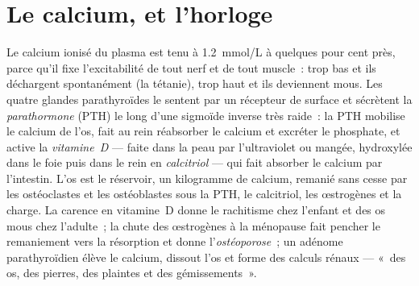 \section{Le calcium, et l'horloge}

\begin{definition}\label{def:b3:endocrinology:calcium}
Le calcium ionisé du plasma est tenu à \qty{1.2}{mmol/L} à quelques pour
cent près, parce qu'il fixe l'excitabilité de tout nerf et de tout
muscle~: trop bas et ils déchargent spontanément (la tétanie), trop haut
et ils deviennent mous. Les quatre glandes parathyroïdes le sentent par
un récepteur de surface et sécrètent la \emph{parathormone} (PTH) le
long d'une sigmoïde inverse très raide~: la PTH mobilise le calcium de
l'os, fait au rein réabsorber le calcium et excréter le phosphate, et
active la \emph{vitamine~D} --- faite dans la peau par l'ultraviolet ou
mangée, hydroxylée dans le foie puis dans le rein en \emph{calcitriol}
--- qui fait absorber le calcium par l'intestin. L'os est le réservoir,
un kilogramme de calcium, remanié sans cesse par les ostéoclastes et les
ostéoblastes sous la PTH, le calcitriol, les œstrogènes et la charge.
La carence en vitamine~D donne le rachitisme chez l'enfant et des os
mous chez l'adulte~; la chute des œstrogènes à la ménopause fait pencher
le remaniement vers la résorption et donne l'\emph{ostéoporose}~; un
adénome parathyroïdien élève le calcium, dissout l'os et forme des
calculs rénaux --- «~des os, des pierres, des plaintes et des gémissements~».
\end{definition}

